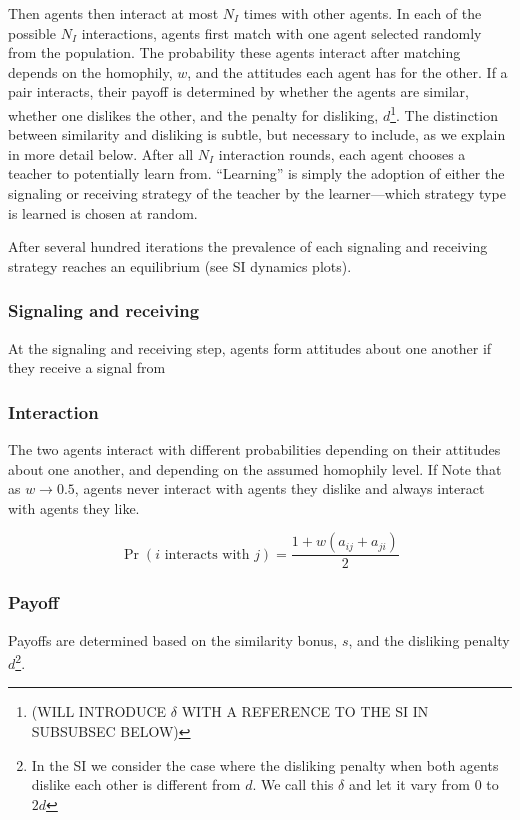 \documentclass[11pt,letterpaper]{article}
\begin{document}
Then agents then
interact at most $N_I$ times with other agents. In each of the possible 
$N_I$ interactions, agents first match with one agent selected randomly from
the population. The probability these agents interact after matching depends
on the homophily, $w$, and the attitudes each agent has for the other. 
If a pair interacts, their payoff is determined by whether the agents are
similar, whether one dislikes the other, and the penalty for disliking,
$d$\footnote{(WILL INTRODUCE $\delta$ WITH A REFERENCE TO THE SI IN SUBSUBSEC
BELOW)}. The distinction between similarity and disliking is subtle, 
but necessary to include, as we explain in more detail below. After all
$N_I$ interaction rounds, each agent chooses a teacher to potentially learn
from. ``Learning'' is simply the adoption of either the signaling or
receiving strategy of the teacher by the learner---which strategy type is 
learned is chosen at random. 

After several hundred iterations the prevalence of each signaling and
receiving strategy reaches an equilibrium (see SI dynamics plots). 


\subsubsection{Signaling and receiving}

At the signaling and receiving step, agents form attitudes about one another if
they receive a signal from 

\subsubsection{Interaction}

The two agents interact with different probabilities
depending on their attitudes about one another, and depending on the 
assumed homophily level. If  Note that as $w \rightarrow 0.5$,
agents never interact with agents they dislike and always interact with 
agents they like.

\begin{equation}
  \Pr(\text{$i$ interacts with $j$}) = \frac{1 + w(a_{ij} + a_{ji})}{2}
\end{equation}
\noindent

\subsubsection{Payoff}

Payoffs are determined based on the similarity bonus, $s$, and the disliking
penalty $d$\footnote{In the SI we consider the case where the disliking penalty 
when both agents dislike each other is different from $d$. We call this $\delta$
and let it vary from 0 to $2d$}. 
\end{document}
